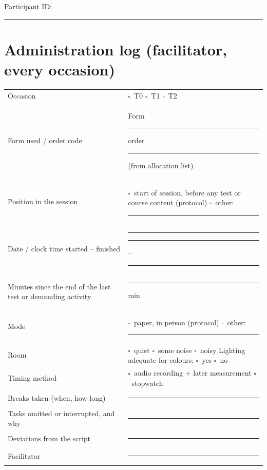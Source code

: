 \documentclass[10pt,a4paper]{article}
\newcommand{\blank}[1][1.2cm]{\rule{#1}{0.4pt}}
\newcommand{\bx}{$\square$}
\begin{document}
Participant ID: \blank[4cm]
\section*{Administration log (facilitator, every occasion)}
\begin{tabular}{@{}p{6.3cm}p{10cm}@{}}\toprule
Occasion & \bx\ T0 \quad \bx\ T1 \quad \bx\ T2 \\
Form used / order code & Form \blank[1cm] \quad order \blank[1.5cm] (from allocation list)\\
Position in the session & \bx\ start of session, before any test or course content (protocol) \quad \bx\ other: \blank[3cm]\\
Date / clock time started -- finished & \blank[2.5cm] \quad \blank[1.5cm] -- \blank[1.5cm]\\
Minutes since the end of the last test or demanding activity & \blank[1.5cm] min\\
Mode & \bx\ paper, in person (protocol) \quad \bx\ other: \blank[3cm]\\
Room & \bx\ quiet \quad \bx\ some noise \quad \bx\ noisy \quad Lighting adequate for colours: \bx\ yes \bx\ no\\
Timing method & \bx\ audio recording + later measurement \quad \bx\ stopwatch\\
Breaks taken (when, how long) & \blank[8cm]\\
Tasks omitted or interrupted, and why & \blank[8cm]\\
Deviations from the script & \blank[8cm]\\
Facilitator & \blank[5cm]\\ \bottomrule
\end{tabular}
\end{document}
